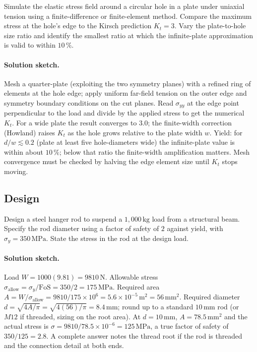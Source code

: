 \begin{exercise}
Simulate the elastic stress field around a circular hole in a plate
under uniaxial tension using a finite-difference or finite-element
method. Compare the maximum stress at the hole's edge to the Kirsch
prediction $K_t = 3$. Vary the plate-to-hole size ratio and identify
the smallest ratio at which the infinite-plate approximation is
valid to within $10\,\%$.
\paragraph{Solution sketch.} Mesh a quarter-plate (exploiting the two
symmetry planes) with a refined ring of elements at the hole edge;
apply uniform far-field tension on the outer edge and symmetry
boundary conditions on the cut planes. Read $\sigma_{yy}$ at the edge
point perpendicular to the load and divide by the applied stress to get
the numerical $K_t$. For a wide plate the result converges to $3.0$;
the finite-width correction (Howland) raises $K_t$ as the hole grows
relative to the plate width $w$. Yield: for $d/w \lesssim 0.2$ (plate
at least five hole-diameters wide) the infinite-plate value is within
about $10\,\%$; below that ratio the finite-width amplification matters.
Mesh convergence must be checked by halving the edge element size until
$K_t$ stops moving.
\end{exercise}

\subsection*{Design}

\begin{exercise}
Design a steel hanger rod to suspend a $1{,}000\,\si{\kilogram}$ load
from a structural beam. Specify the rod diameter using a factor of
safety of $2$ against yield, with $\sigma_y = 350\,\text{MPa}$. State
the stress in the rod at the design load.
\paragraph{Solution sketch.} Load $W = 1000(9.81) = 9810\,\text{N}$.
Allowable stress $\sigma_{\text{allow}} = \sigma_y/\text{FoS} = 350/2 =
175\,\text{MPa}$. Required area $A = W/\sigma_{\text{allow}} = 9810/
175\times 10^6 = 5.6\times 10^{-5}\,\si{\meter}^2 = 56\,\si{\milli
\meter}^2$. Required diameter $d = \sqrt{4A/\pi} = \sqrt{4(56)/\pi} =
8.4\,\si{\milli\meter}$; round up to a standard $10\,\si{\milli\meter}$
rod (or $M12$ if threaded, sizing on the root area). At $d = 10\,\si{
\milli\meter}$, $A = 78.5\,\si{\milli\meter}^2$ and the actual stress is
$\sigma = 9810/78.5\times 10^{-6} = 125\,\text{MPa}$, a true factor of
safety of $350/125 = 2.8$. A complete answer notes the thread root if
the rod is threaded and the connection detail at both ends.
\end{exercise}

